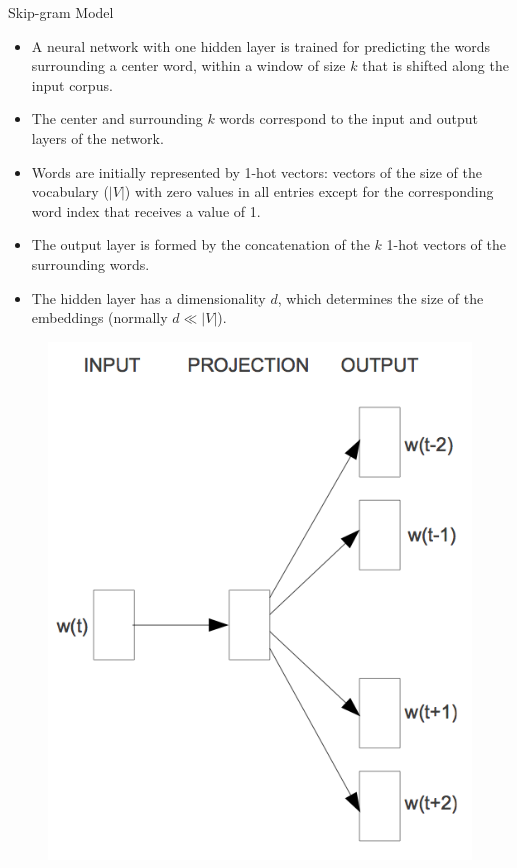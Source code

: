 \begin{frame}{Skip-gram Model}
\begin{scriptsize}
\begin{itemize}
\item A neural network with one hidden layer is trained for predicting the words surrounding a center word, within a window  of size $k$ that is shifted along the input corpus. 
\item The center and surrounding $k$ words correspond to the input and output layers of the network.
\item Words are initially represented by 1-hot vectors: vectors of the size of the vocabulary ($|V|$) with zero values in all entries except for the corresponding word index that receives a value of 1. 
\item The output layer is formed by the concatenation of the $k$ 1-hot vectors of the surrounding words. 
\item The hidden layer has a dimensionality $d$, which determines the size of the embeddings (normally $d \ll |V|$).
\end{itemize}
\end{scriptsize}
  \begin{figure}[h]
        	\includegraphics[scale = 0.33]{pics/skip-gram.png}
        \end{figure}

\end{frame}


